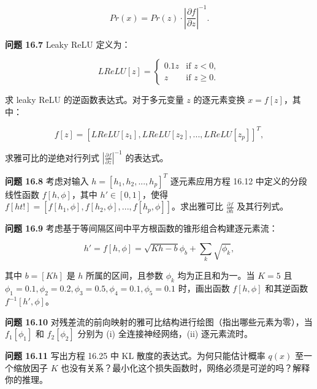 \begin{equation}
Pr(x) = Pr(z) \cdot \left| \frac{\partial f}{\partial z} \right|^{-1}. 
\end{equation}

\textbf{问题 16.7} Leaky ReLU 定义为：

\begin{equation}
LReLU[z] = \begin{cases}
0.1z & \text{if } z < 0, \\
z & \text{if } z \geq 0.
\end{cases} 
\end{equation}

求 leaky ReLU 的逆函数表达式。对于多元变量 \(z\) 的逐元素变换 \(x = f[z]\)，其中：

\begin{equation}
f[z] = [LReLU[z_1], LReLU[z_2], ..., LReLU[z_p]]^T, 
\end{equation}

求雅可比的逆绝对行列式 \(\left| \frac{\partial f}{\partial z} \right|^{-1}\) 的表达式。

\textbf{问题 16.8} 考虑对输入 \(h = [h_1, h_2, ..., h_p]^T\) 逐元素应用方程 16.12 中定义的分段线性函数 \(f[h, \phi]\)，其中 \(h' \in [0, 1]\)，使得 \(f[ht!] = [f[h_1, \phi], f[h_2, \phi], ..., f[h_p, \phi]]\)。求出雅可比 \(\frac{\partial f}{\partial h}\) 及其行列式。

\textbf{问题 16.9} 考虑基于等间隔区间中平方根函数的锥形组合构建逐元素流：

\begin{equation}
h' = f[h, \phi] = \sqrt{K h - b} \phi_b + \sum_{k} \sqrt{\phi_k}, 
\end{equation}

其中 \(b = [Kh]\) 是 \(h\) 所属的区间，且参数 \(\phi_k\) 均为正且和为一。当 \(K = 5\) 且 \(\phi_1 = 0.1, \phi_2 = 0.2, \phi_3 = 0.5, \phi_4 = 0.1, \phi_5 = 0.1\) 时，画出函数 \(f[h, \phi]\) 和其逆函数 \(f^{-1}[h', \phi]\)。

\textbf{问题 16.10} 对残差流的前向映射的雅可比结构进行绘图（指出哪些元素为零），当 \(f_1[\phi_1]\) 和 \(f_2[\phi_2]\) 分别为 (i) 全连接神经网络，(ii) 逐元素流时。

\textbf{问题 16.11} 写出方程 16.25 中 KL 散度的表达式。为何只能估计概率 \(q(x)\) 至一个缩放因子 \(K\) 也没有关系？最小化这个损失函数时，网络必须是可逆的吗？解释你的推理。
